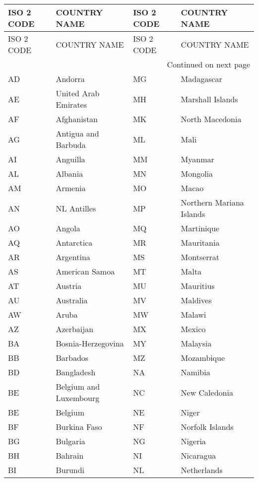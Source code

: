 {\tiny%
\begin{longtable}{lp{5cm}||lp{5cm}}%
\toprule
ISO 2 CODE & COUNTRY NAME & ISO 2 CODE & COUNTRY NAME \\
\midrule
\endfirsthead

\toprule
ISO 2 CODE & COUNTRY NAME & ISO 2 CODE & COUNTRY NAME \\
\midrule
\endhead
\midrule
\multicolumn{4}{r}{{Continued on next page}} \\
\midrule
\endfoot

\bottomrule
\endlastfoot
 AD & Andorra & MG & Madagascar \\
 AE & United Arab Emirates & MH & Marshall Islands \\
 AF & Afghanistan & MK & North Macedonia \\
 AG & Antigua and Barbuda & ML & Mali \\
 AI & Anguilla & MM & Myanmar \\
 AL & Albania & MN & Mongolia \\
 AM & Armenia & MO & Macao \\
 AN & NL Antilles & MP & Northern Mariana Islands \\
 AO & Angola & MQ & Martinique \\
 AQ & Antarctica & MR & Mauritania \\
 AR & Argentina & MS & Montserrat \\
 AS & American Samoa & MT & Malta \\
 AT & Austria & MU & Mauritius \\
 AU & Australia & MV & Maldives \\
 AW & Aruba & MW & Malawi \\
 AZ & Azerbaijan & MX & Mexico \\
 BA & Bosnia-Herzegovina & MY & Malaysia \\
 BB & Barbados & MZ & Mozambique \\
 BD & Bangladesh & NA & Namibia \\
 BE & Belgium and Luxembourg & NC & New Caledonia \\
 BE & Belgium & NE & Niger \\
 BF & Burkina Faso & NF & Norfolk Islands \\
 BG & Bulgaria & NG & Nigeria \\
 BH & Bahrain & NI & Nicaragua \\
 BI & Burundi & NL & Netherlands \\

\end{longtable}}
